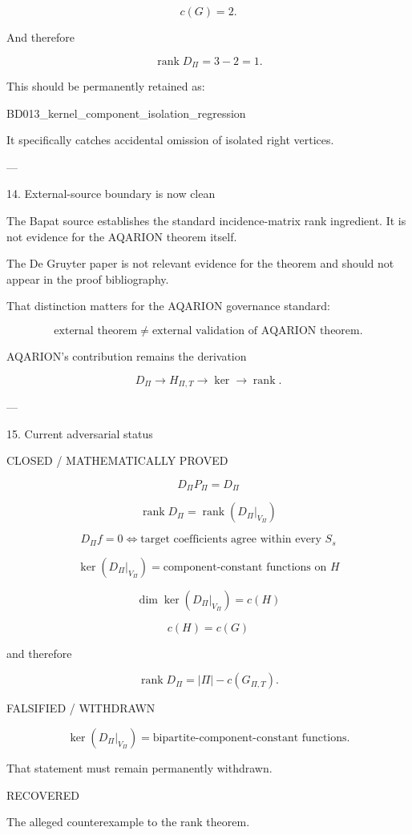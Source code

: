 \[
c(G)=2.
\]

And therefore

\[
\boxed{\operatorname{rank}D_\Pi=3-2=1.}
\]

This should be permanently retained as:

BD013_kernel_component_isolation_regression

It specifically catches accidental omission of isolated right vertices.


---

14. External-source boundary is now clean

The Bapat source establishes the standard incidence-matrix rank ingredient. It is not evidence for the AQARION theorem itself. 

The De Gruyter paper is not relevant evidence for the theorem and should not appear in the proof bibliography. 

That distinction matters for the AQARION governance standard:

\[
\boxed{
\text{external theorem}
\neq
\text{external validation of AQARION theorem}.
}
\]

AQARION's contribution remains the derivation

\[
D_\Pi
\rightarrow
H_{\Pi,T}
\rightarrow
\ker
\rightarrow
\operatorname{rank}.
\]


---

15. Current adversarial status

CLOSED / MATHEMATICALLY PROVED

\[
D_\Pi P_\Pi=D_\Pi
\]

\[
\operatorname{rank}D_\Pi
=
\operatorname{rank}(D_\Pi|_{V_\Pi})
\]

\[
D_\Pi f=0
\iff
\text{target coefficients agree within every }S_s
\]

\[
\ker(D_\Pi|_{V_\Pi})
=
\text{component-constant functions on }H
\]

\[
\dim\ker(D_\Pi|_{V_\Pi})=c(H)
\]

\[
c(H)=c(G)
\]

and therefore

\[
\boxed{
\operatorname{rank}D_\Pi
=
|\Pi|-c(G_{\Pi,T}).
}
\]

FALSIFIED / WITHDRAWN

\[
\ker(D_\Pi|_{V_\Pi})
=
\text{bipartite-component-constant functions}.
\]

That statement must remain permanently withdrawn.

RECOVERED

The alleged counterexample to the rank theorem.


